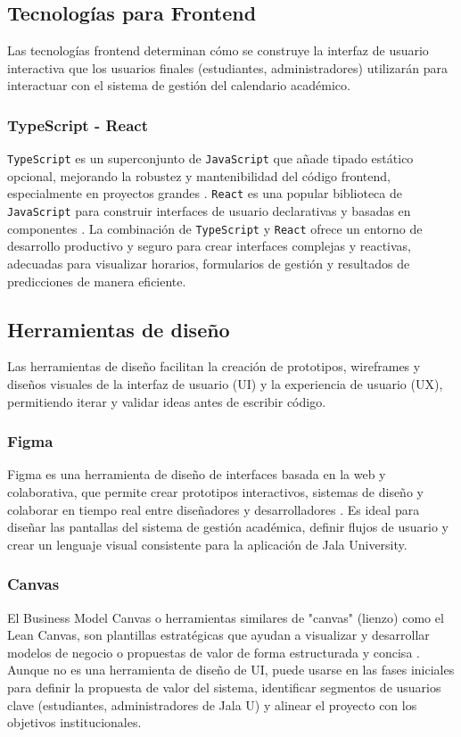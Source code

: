 \subsection{Tecnologías para Frontend}
Las tecnologías frontend determinan cómo se construye la interfaz de usuario interactiva que los usuarios finales (estudiantes, administradores) utilizarán para interactuar con el sistema de gestión del calendario académico.

\subsubsection{TypeScript - React}
\texttt{TypeScript} es un superconjunto de \texttt{JavaScript} que añade tipado estático opcional, mejorando la robustez y mantenibilidad del código frontend, especialmente en proyectos grandes \parencite{MicrosoftTypeScript}. \texttt{React} es una popular biblioteca de \texttt{JavaScript} para construir interfaces de usuario declarativas y basadas en componentes \parencite{FacebookReact}. La combinación de \texttt{TypeScript} y \texttt{React} ofrece un entorno de desarrollo productivo y seguro para crear interfaces complejas y reactivas, adecuadas para visualizar horarios, formularios de gestión y resultados de predicciones de manera eficiente.

\subsection{Herramientas de diseño}
Las herramientas de diseño facilitan la creación de prototipos, wireframes y diseños visuales de la interfaz de usuario (UI) y la experiencia de usuario (UX), permitiendo iterar y validar ideas antes de escribir código.

\subsubsection{Figma}
Figma es una herramienta de diseño de interfaces basada en la web y colaborativa, que permite crear prototipos interactivos, sistemas de diseño y colaborar en tiempo real entre diseñadores y desarrolladores \parencite{Figma}. Es ideal para diseñar las pantallas del sistema de gestión académica, definir flujos de usuario y crear un lenguaje visual consistente para la aplicación de Jala University.

\subsubsection{Canvas}
El Business Model Canvas o herramientas similares de "canvas" (lienzo) como el Lean Canvas, son plantillas estratégicas que ayudan a visualizar y desarrollar modelos de negocio o propuestas de valor de forma estructurada y concisa \parencite{OsterwalderPigneur2010}. Aunque no es una herramienta de diseño de UI, puede usarse en las fases iniciales para definir la propuesta de valor del sistema, identificar segmentos de usuarios clave (estudiantes, administradores de Jala U) y alinear el proyecto con los objetivos institucionales.

